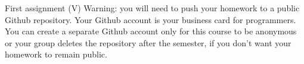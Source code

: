 \documentclass[10pt,color=usenames,dvipsnames]{beamer}
\begin{document}
\begin{frame}{First assignment (V)}
    Warning: you will need to push your homework to a public Github repository. Your Github account
    is your business card for programmers. You can create a separate Github account only for this
    course to be anonymous or your group deletes the repository after the semester, if you don't
    want your homework to remain public.
\end{frame}
\end{document}
